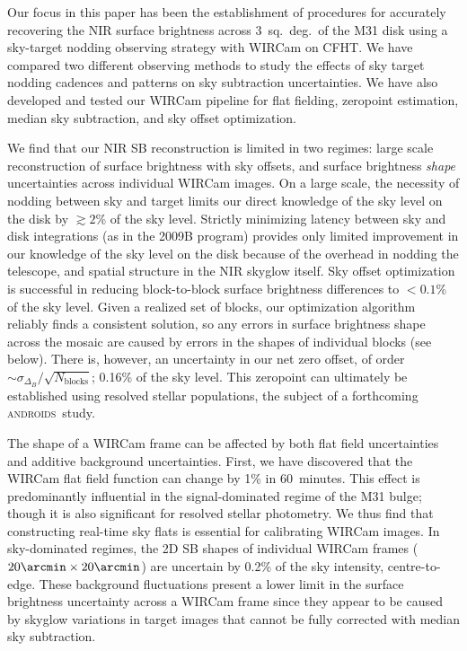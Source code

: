 \documentclass[iop]{emulateapj}
\newcommand{\androids}{\textsc{androids}}
\begin{document}
Our focus in this paper has been the establishment of procedures for accurately recovering the NIR surface brightness across 3~sq.~deg.\ of the M31 disk using a sky-target nodding observing strategy with WIRCam on CFHT\@.
We have compared two different observing methods to study the effects of sky target nodding cadences and patterns on sky subtraction uncertainties.
We have also developed and tested our WIRCam pipeline for flat fielding, zeropoint estimation, median sky subtraction, and sky offset optimization.

We find that our NIR SB reconstruction is limited in two regimes: large scale reconstruction of surface brightness with sky offsets, and surface brightness \emph{shape} uncertainties across individual WIRCam images.
On a large scale, the necessity of nodding between sky and target limits our direct knowledge of the sky level on the disk by $\gtrsim 2$\% of the sky level.
Strictly minimizing latency between sky and disk integrations (as in the 2009B program) provides only limited improvement in our knowledge of the sky level on the disk because of the overhead in nodding the telescope, and spatial structure in the NIR skyglow itself.
Sky offset optimization is successful in reducing block-to-block surface brightness differences to $<0.1$\% of the sky level.
Given a realized set of blocks, our optimization algorithm reliably finds a consistent solution, so any errors in surface brightness shape across the mosaic are caused by errors in the shapes of individual blocks (see below).
There is, however, an uncertainty in our net zero offset, of order $\sim \sigma_{\Delta_B} / \sqrt{N_\mathrm{blocks}}$; 0.16\% of the sky level.
This zeropoint can ultimately be established using resolved stellar populations, the subject of a forthcoming \androids\ study.

The shape of a WIRCam frame can be affected by both flat field uncertainties and additive background uncertainties.
First, we have discovered that the WIRCam flat field function can change by 1\% in 60~minutes.
This effect is predominantly influential in the signal-dominated regime of the M31 bulge; though it is also significant for resolved stellar photometry.
We thus find that constructing real-time sky flats is essential for calibrating WIRCam images.
In sky-dominated regimes, the 2D SB shapes of individual WIRCam frames ($20\arcmin\times20\arcmin$) are uncertain by 0.2\% of the sky intensity, centre-to-edge.
These background fluctuations present a lower limit in the surface brightness uncertainty across a WIRCam frame since they appear to be caused by skyglow variations in target images that cannot be fully corrected with median sky subtraction.
\end{document}
